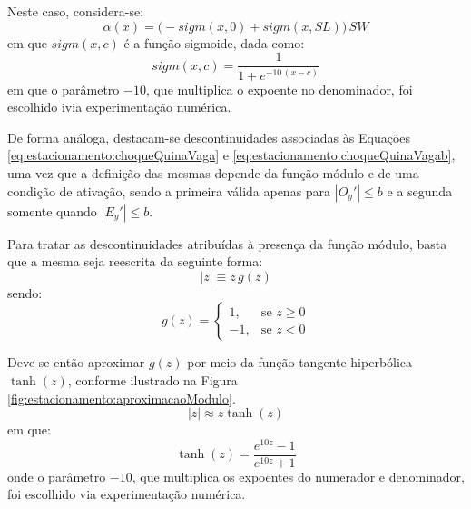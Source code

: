 Neste caso, considera-se:
%
\begin{equation}
\alpha(x) = \big(-sigm(x, 0) + sigm(x, SL)\big) \, SW
\end{equation} 
%
em que $ sigm(x, c) $ é a função sigmoide, dada como:
%
\begin{equation}
	sigm(x, c) = \frac{1}{1 + e^{-10 \, (x - c)}}
\end{equation} 
%
em que o parâmetro $ -10 $, que multiplica o expoente no denominador, foi escolhido ivia experimentação numérica. 

De forma análoga, destacam-se descontinuidades associadas às Equações \eqref{eq:estacionamento:choqueQuinaVaga} e \eqref{eq:estacionamento:choqueQuinaVagab}, uma vez que a definição das mesmas depende da função módulo e de uma condição de ativação, sendo a primeira válida apenas para $ |O_y'| \leq b $ e a segunda somente quando $ |E_y'| \leq b $. 

Para tratar as descontinuidades atribuídas à presença da função módulo, basta que a mesma seja reescrita da seguinte forma:
%
\begin{equation}
	|z| \equiv z \, g(z)
\end{equation}
%
sendo:
%
\begin{equation}
	g(z) = \begin{cases} 1, & \mbox{se } z \geq 0 \\ -1, & \mbox{se } z < 0 \end{cases}
\end{equation}

Deve-se então aproximar $ g(z) $ por meio da função tangente hiperbólica $\tanh(z) $, conforme ilustrado na Figura \ref{fig:estacionamento:aproximacaoModulo}.
\begin{equation}
	\label{eq:estacionamento:aproximacaoModulo}
	|z| \approx z \tanh(z)
\end{equation}
%
em que:
%
\begin{equation}
	\tanh(z) = \frac{e^{10z} - 1}{e^{10z} + 1}
\end{equation}
%
onde o parâmetro $ -10 $, que multiplica os expoentes do numerador e denominador, foi escolhido via experimentação numérica. 

